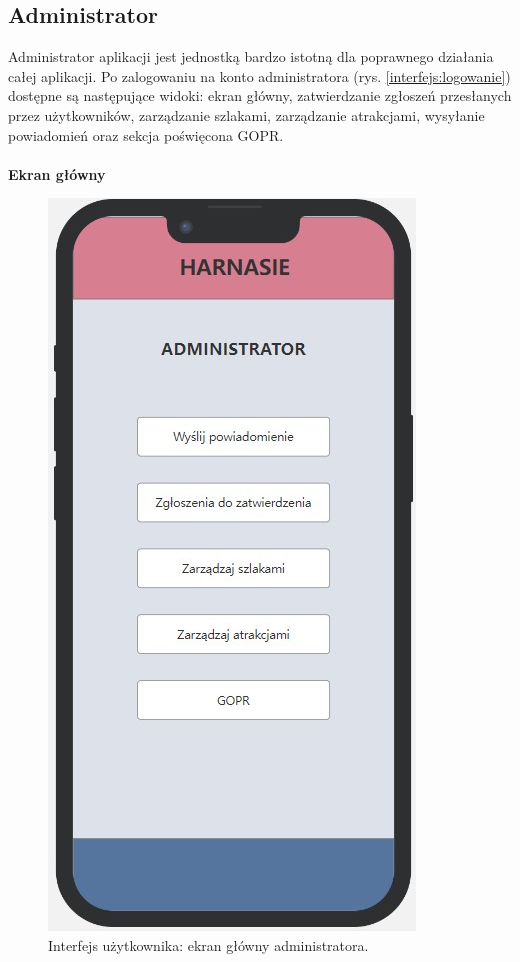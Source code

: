     \subsection*{Administrator}
    Administrator aplikacji jest jednostką bardzo istotną dla poprawnego działania całej aplikacji. Po zalogowaniu na konto administratora (rys. \ref{interfejs:logowanie}) dostępne są następujące widoki: ekran główny, zatwierdzanie zgłoszeń przesłanych przez użytkowników, zarządzanie szlakami, zarządzanie atrakcjami, wysyłanie powiadomień oraz sekcja poświęcona GOPR.\\
    \\
    \textbf{Ekran główny}
     \begin{figure}[H]
        \centering
        \includegraphics[scale=0.5]{img/interfejsy/if_admin.jpg}
        \caption{Interfejs użytkownika: ekran główny administratora.}
        \label{interfejs:admin}
    \end{figure}
